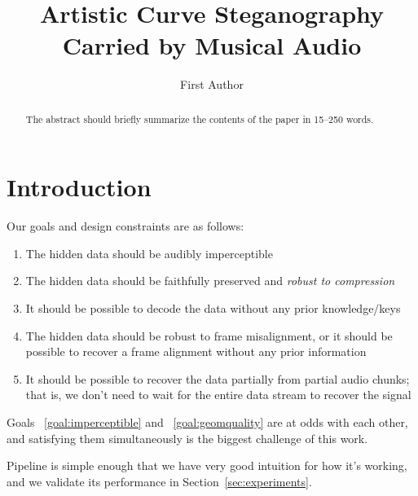 \documentclass[runningheads]{llncs}
\begin{document}
%
\title{Artistic Curve Steganography Carried by Musical Audio}
%
%
\author{First Author}
%
%
%
\maketitle              %
%
\begin{abstract}
The abstract should briefly summarize the contents of the paper in
15--250 words.

\end{abstract}
%
%
%
\section{Introduction}



Our goals and design constraints are as follows:
\begin{enumerate}
    \item \label{goal:imperceptible} The hidden data should be audibly imperceptible
    \item \label{goal:geomquality} The hidden data should be faithfully preserved and {\em robust to compression}
    \item \label{goal:nokeys} It should be possible to decode the data without any prior knowledge/keys
    \item \label{goal:misalignment} The hidden data should be robust to frame misalignment, or it should be possible to recover a frame alignment without any prior information
    \item \label{goal:partial} It should be possible to recover the data partially from partial audio chunks; that is, we don't need to wait for the entire data stream to recover the signal
\end{enumerate}

Goals ~\ref{goal:imperceptible} and ~\ref{goal:geomquality} are at odds with each other, and satisfying them simultaneously is the biggest challenge of this work.

Pipeline is simple enough that we have very good intuition for how it's working, and we validate its performance in Section~\ref{sec:experiments}.
\end{document}
